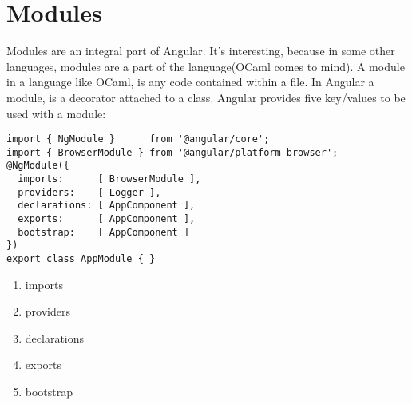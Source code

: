 \section{ Modules }
\maketitle{}

Modules are an integral part of Angular. It's interesting, because in some
other languages, modules are a part of the language(OCaml comes to mind). A
module in a language like OCaml, is any code contained within a file. In Angular
a module, is a decorator attached to a class. Angular provides five key/values
to be used with a module:
\begin{lstlisting}
import { NgModule }      from '@angular/core';
import { BrowserModule } from '@angular/platform-browser';
@NgModule({
  imports:      [ BrowserModule ],
  providers:    [ Logger ],
  declarations: [ AppComponent ],
  exports:      [ AppComponent ],
  bootstrap:    [ AppComponent ]
})
export class AppModule { }
\end{lstlisting}

\begin{enumerate}
  \item imports
  \item providers
  \item declarations
  \item exports
  \item bootstrap
\end{enumerate}
